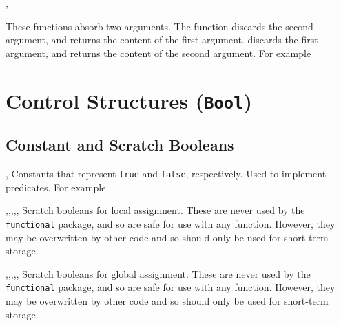 \documentclass[oneside]{book}
\let\tn=\cs
\begin{document}
\begin{function}{\useGobble,\gobbleUse}
\begin{syntax}
  
  
\end{syntax}
These functions absorb two arguments.
The function  discards the second argument,
and returns the content of the first argument.
 discards the first argument,
and returns the content of the second argument.
For example
\begin{demohigh}
\end{demohigh}
\end{function}

\chapter{Control Structures (\texttt{Bool})}

\section{Constant and Scratch Booleans}

\begin{variable}{\cTrueBool,\cFalseBool}
Constants that represent \verb|true| and \verb|false|, respectively. Used to
implement predicates. For example
\begin{demohigh}
\boolVarIfTF {} {}
\boolVarIfTF {} {}
\end{demohigh}
\end{variable}

\begin{variable}{\lTmpaBool,\lTmpbBool,\lTmpcBool,\lTmpiBool,\lTmpjBool,\lTmpkBool}
Scratch booleans for local assignment. These are never used by
the \verb!functional! package, and so are safe for use with any
function. However, they may be overwritten by other
code and so should only be used for short-term storage.
\end{variable}

\begin{variable}{\gTmpaBool,\gTmpbBool,\gTmpcBool,\gTmpiBool,\gTmpjBool,\gTmpkBool}
Scratch booleans for global assignment. These are never used by
the \verb!functional! package, and so are safe for use with any
function. However, they may be overwritten by other
code and so should only be used for short-term storage.
\end{variable}
\end{document}
